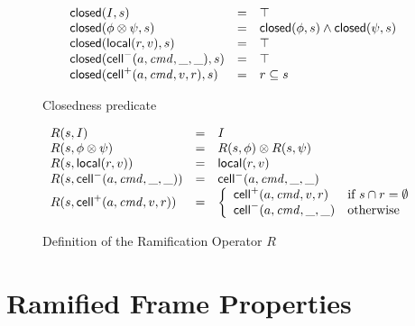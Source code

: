 \begin{figure}
\mbox{}
  \begin{displaymath}
    \begin{array}{lcl}
      \mathsf{closed}({I}, {s}) & = & \top \\
      \mathsf{closed}({\phi \otimes \psi}, {s}) & = & \mathsf{closed}({\phi}, {s}) \land \mathsf{closed}({\psi}, {s}) \\ 
      \mathsf{closed}({\mathsf{local}({r}, {v})}, {s}) & = & \top \\
      \mathsf{closed}({\mathsf{cell}^{-}({a}, {\mathit{cmd}}, {\_}, {\_})}, {s}) & = & \top \\
      \mathsf{closed}({\mathsf{cell}^{+}({a}, {\mathit{cmd}}, {v}, {r})}, {s}) & = & r \subseteq s \\
    \end{array}
  \end{displaymath}
\caption{Closedness predicate}
\label{closedness}  
\end{figure}

\begin{figure}
\mbox{}
  \begin{displaymath}
    \begin{array}{lcl}
      R(s, I)                 & = & I \\
      R(s, \phi \otimes \psi) & = & R(s, \phi) \otimes R(s, \psi) \\
      R(s, \mathsf{local}({r}, {v}))   & = & \mathsf{local}({r}, {v}) \\
      R(s, \mathsf{cell}^{-}({a}, {\mathit{cmd}}, {\_}, {\_}))    & = & \mathsf{cell}^{-}({a}, {\mathit{cmd}}, {\_}, {\_}) \\
      R(s, \mathsf{cell}^{+}({a}, {\mathit{cmd}}, {v}, {r})) & = & \left\{\begin{array}{ll}
                                                \mathsf{cell}^{+}({a}, {\mathit{cmd}}, {v}, {r}) 
                                              & \mbox{if } s \cap r = \emptyset \\
                                                \mathsf{cell}^{-}({a}, {\mathit{cmd}}, {\_}, {\_})
                                              & \mbox{otherwise}
                                              \end{array}
                                       \right.
    \end{array}
  \end{displaymath}
\caption{Definition of the Ramification Operator $R$}
\label{ramify-def}
\end{figure}

\section{Ramified Frame Properties}

